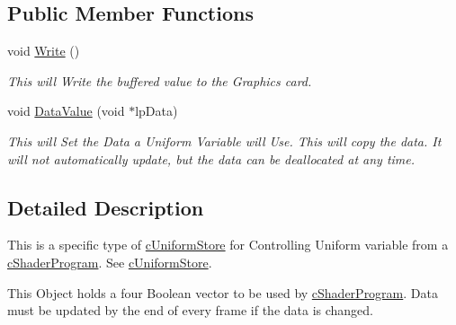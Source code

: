\subsection*{Public Member Functions}
\begin{DoxyCompactItemize}
\item 
\hypertarget{classc_uniform_boolean_vector4_a593a59d870851e5df8e25f7473d5905a}{
void \hyperlink{classc_uniform_boolean_vector4_a593a59d870851e5df8e25f7473d5905a}{Write} ()}
\label{classc_uniform_boolean_vector4_a593a59d870851e5df8e25f7473d5905a}

\begin{DoxyCompactList}\small\item\em This will Write the buffered value to the Graphics card. \end{DoxyCompactList}\item 
\hypertarget{classc_uniform_boolean_vector4_a59291e25e3b2a6264c45934e3e5b91aa}{
void \hyperlink{classc_uniform_boolean_vector4_a59291e25e3b2a6264c45934e3e5b91aa}{DataValue} (void $\ast$lpData)}
\label{classc_uniform_boolean_vector4_a59291e25e3b2a6264c45934e3e5b91aa}

\begin{DoxyCompactList}\small\item\em This will Set the Data a Uniform Variable will Use. This will copy the data. It will not automatically update, but the data can be deallocated at any time. \end{DoxyCompactList}\end{DoxyCompactItemize}


\subsection{Detailed Description}
This is a specific type of \hyperlink{classc_uniform_store}{cUniformStore} for Controlling Uniform variable from a \hyperlink{classc_shader_program}{cShaderProgram}. See \hyperlink{classc_uniform_store}{cUniformStore}. 

This Object holds a four Boolean vector to be used by \hyperlink{classc_shader_program}{cShaderProgram}. Data must be updated by the end of every frame if the data is changed. 